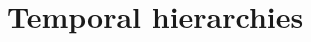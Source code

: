 \documentclass[14pt]{beamer}
\def\fullwidth#1{\vspace*{0.1cm}\par\centerline{\texttt{[image: \#1]}}}
\begin{document}











\section{Temporal hierarchies}
\end{document}
